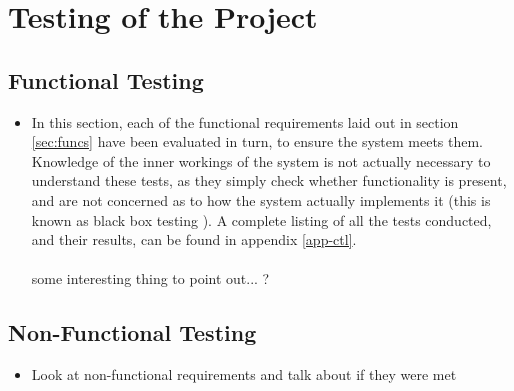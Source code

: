 \section{Testing of the Project}

\subsection{Functional Testing}
{\color{red}
	\begin{itemize}
		\item In this section, each of the functional requirements laid out in section \ref{sec:funcs} have been evaluated in turn, to ensure the system meets them. Knowledge of the inner workings of the system is not actually necessary to understand these tests, as they simply check whether functionality is present, and are not concerned as to how the system actually implements it (this is known as black box testing \cite{beizer1995black}). A complete listing of all the tests conducted, and their results, can be found in appendix \ref{app-ctl}.\ \\
		\ \\
		some interesting thing to point out... ?
	\end{itemize}
}

\subsection{Non-Functional Testing}
{\color{red}
	\begin{itemize}
		\item Look at non-functional requirements and talk about if they were met
	\end{itemize}
}